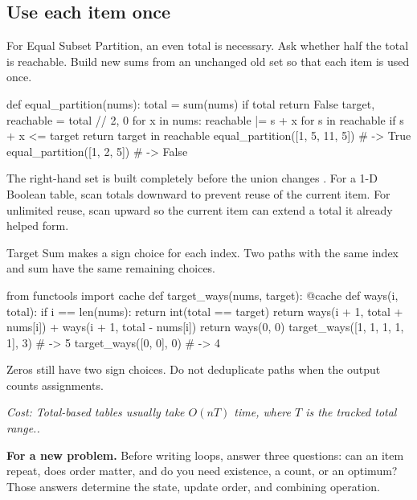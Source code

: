 \documentclass[11pt]{article}
\newcommand{\cd}[1]{{\frenchspacing\texttt{\detokenize{#1}}}}
\newcommand{\transfer}[1]{\par\textbf{For a new problem.} #1\par}
\newcommand{\cost}[1]{\par\textit{Cost: #1.}\par}
\begin{document}
\subsection{Use each item once}
For Equal Subset Partition, an even total is necessary. Ask whether half the total is reachable.
Build new sums from an unchanged old set so that each item is used once.
\par\noindent\begin{minipage}{\linewidth}
\hypertarget{example-start-55}{}
\begin{pyex}
def equal_partition(nums):
    total = sum(nums)
    if total %
        return False
    target, reachable = total // 2, {0}
    for x in nums:
        reachable |= {s + x for s in reachable if s + x <= target}
    return target in reachable
equal_partition([1, 5, 11, 5])       # -> True
equal_partition([1, 2, 5])           # -> False
\end{pyex}
\hypertarget{example-end-55}{}
\end{minipage}\par
The right-hand set is built completely before the union changes \cd{reachable}.
For a 1-D Boolean table, scan totals downward to prevent reuse of the current item.
For unlimited reuse, scan upward so the current item can extend a total it already helped form.

Target Sum makes a sign choice for each index. Two paths with the same index and sum have the same remaining choices.
\par\noindent\begin{minipage}{\linewidth}
\hypertarget{example-start-56}{}
\begin{pyex}
from functools import cache
def target_ways(nums, target):
    @cache
    def ways(i, total):
        if i == len(nums):
            return int(total == target)
        return ways(i + 1, total + nums[i]) + ways(i + 1, total - nums[i])
    return ways(0, 0)
target_ways([1, 1, 1, 1, 1], 3)      # -> 5
target_ways([0, 0], 0)               # -> 4
\end{pyex}
\hypertarget{example-end-56}{}
\end{minipage}\par
Zeros still have two sign choices. Do not deduplicate paths when the output counts assignments.
\cost{Total-based tables usually take \(O(nT)\) time, where \(T\) is the tracked total range.}
\transfer{Before writing loops, answer three questions: can an item repeat, does order matter, and do you need existence, a count, or an optimum?
Those answers determine the state, update order, and combining operation.}
\end{document}
